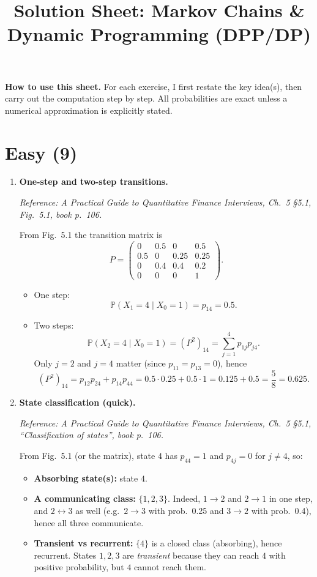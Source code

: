 \documentclass[11pt]{article}
\title{Solution Sheet: Markov Chains \& Dynamic Programming (DPP/DP)}
\author{}
\date{}
\begin{document}
\maketitle

\noindent\textbf{How to use this sheet.}
For each exercise, I first restate the key idea(s), then carry out the computation step by step.
All probabilities are exact unless a numerical approximation is explicitly stated.

\section*{Easy (9)}

\begin{enumerate}[leftmargin=*, itemsep=1.0em]

\item \textbf{One-step and two-step transitions.}

\textit{Reference: A Practical Guide to Quantitative Finance Interviews, Ch.\ 5 \S5.1, Fig.\ 5.1, book p.\ 106.}

\medskip
From Fig.\ 5.1 the transition matrix is
\[
P=\begin{pmatrix}
0 & 0.5 & 0 & 0.5\\
0.5 & 0 & 0.25 & 0.25\\
0 & 0.4 & 0.4 & 0.2\\
0 & 0 & 0 & 1
\end{pmatrix}.
\]

\begin{itemize}
\item One step:
\[
\mathbb{P}(X_1=4\mid X_0=1)=p_{14}=0.5.
\]
\item Two steps:
\[
\mathbb{P}(X_2=4\mid X_0=1)=(P^2)_{14}=\sum_{j=1}^4 p_{1j}p_{j4}.
\]
Only $j=2$ and $j=4$ matter (since $p_{11}=p_{13}=0$), hence
\[
(P^2)_{14}=p_{12}p_{24}+p_{14}p_{44}
=0.5\cdot 0.25 + 0.5\cdot 1
=0.125+0.5=\frac{5}{8}=0.625.
\]
\end{itemize}

\item \textbf{State classification (quick).}

\textit{Reference: A Practical Guide to Quantitative Finance Interviews, Ch.\ 5 \S5.1, ``Classification of states'', book p.\ 106.}

\medskip
From Fig.\ 5.1 (or the matrix), state $4$ has $p_{44}=1$ and $p_{4j}=0$ for $j\neq 4$, so:

\begin{itemize}
\item \textbf{Absorbing state(s):} state $4$.
\item \textbf{A communicating class:} $\{1,2,3\}$. Indeed, $1\to 2$ and $2\to 1$ in one step, and $2\leftrightarrow 3$ as well (e.g.\ $2\to 3$ with prob.\ 0.25 and $3\to 2$ with prob.\ 0.4), hence all three communicate.
\item \textbf{Transient vs recurrent:} $\{4\}$ is a closed class (absorbing), hence recurrent. States $1,2,3$ are \emph{transient} because they can reach $4$ with positive probability, but $4$ cannot reach them.
\end{itemize}


\end{enumerate}
\end{document}

